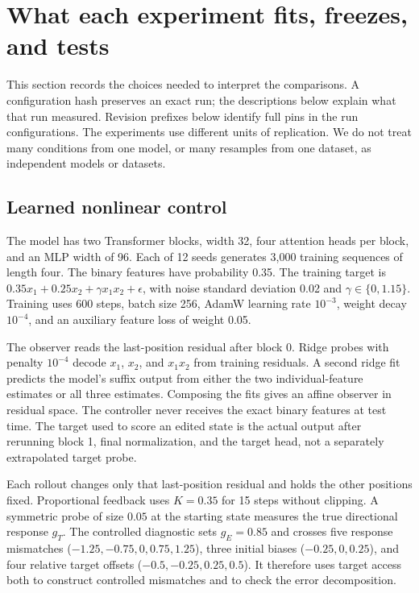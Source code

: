 \section{What each experiment fits, freezes, and tests}
\label{app:protocol-details}

This section records the choices needed to interpret the comparisons. A
configuration hash preserves an exact run; the descriptions below explain
what that run measured. Revision prefixes below identify full pins in the run
configurations. The experiments use different units of replication.
We do not treat many conditions from one model, or many resamples from one
dataset, as independent models or datasets.

\subsection{Learned nonlinear control}

The model has two Transformer blocks, width 32, four attention heads per block,
and an MLP width of 96. Each of 12 seeds generates 3,000 training sequences of
length four. The binary features have probability 0.35. The training target is
$0.35x_1+0.25x_2+\gamma x_1x_2+\epsilon$, with noise standard deviation
0.02 and $\gamma\in\{0,1.15\}$. Training uses 600 steps, batch size 256,
AdamW learning rate $10^{-3}$, weight decay $10^{-4}$, and an auxiliary
feature loss of weight 0.05.

The observer reads the last-position residual after block 0. Ridge probes
with penalty $10^{-4}$ decode $x_1$, $x_2$, and $x_1x_2$ from training
residuals. A second ridge fit predicts the model's suffix output from either
the two individual-feature estimates or all three estimates. Composing the
fits gives an affine observer in residual space. The controller never receives
the exact binary features at test time. The target used to score an edited
state is the actual output after rerunning block 1, final normalization, and
the target head, not a separately extrapolated target probe.

Each rollout changes only that last-position residual and holds the other
positions fixed. Proportional feedback uses $K=0.35$ for 15 steps without
clipping. A symmetric probe of size $0.05$ at the starting state measures the
true directional response $g_T$. The controlled diagnostic sets $g_E=0.85$
and crosses five response mismatches ($-1.25,-0.75,0,0.75,1.25$), three
initial biases ($-0.25,0,0.25$), and four relative target offsets
($-0.5,-0.25,0.25,0.5$). It therefore uses target access both to construct
controlled mismatches and to check the error decomposition.

